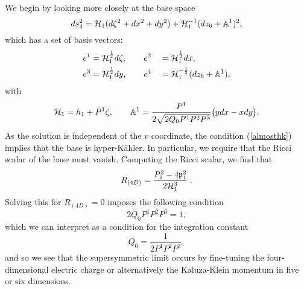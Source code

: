We begin by looking more closely at the base space
\begin{equation*}
    ds^2_4 = {\cal H}_1 ( d\zeta^2 + dx^2 + dy^2) + {\cal H}_1^{-1} (dz_6 + \mathbb{A}^1)^2 ,
\end{equation*}
which has a set of basis vectors:
\begin{equation*}
    \begin{aligned}
        e^1 &= {\cal H}_1^{\frac{1}{2}} d\zeta, \qquad e^2 &&= {\cal H}_1^{\frac{1}{2}} dx ,\\
        e^3 &= {\cal H}_1^{\frac{1}{2}} dy, \qquad e^4 &&= {\cal H}_1^{-\frac{1}{2}} (dz_6 + \mathbb{A}^1) ,\\
    \end{aligned}
\end{equation*}
with
\begin{equation}
{\cal H}_1 = h_1 + P^1 \zeta, \qquad \mathbb{A}^1={P^1 \over 2 \sqrt{2 Q_0 P^1 P^2 P^3}} \big(y dx-x dy \big).
\end{equation}
As the solution is independent of the $v$ coordinate, the condition ({\ref{almosthk}}) implies that the base is hyper-K\"ahler. In particular, we require that the Ricci scalar of the base must vanish. Computing the Ricci scalar, we find that
\begin{equation*}
	R_{(4D)} = \frac{P^2_1 - 4 \mathfrak{p}_1^2}{2 {\cal H}_1^3} \;.
\end{equation*}
Solving this for $R_{(4D)} = 0$ imposes the following condition
\begin{equation*}
2 Q_0 P^1 P^2 P^3 =1,
\end{equation*}
which we can interpret as a condition for the integration constant
\begin{equation*}
    Q_0 = \frac{1}{2 P^1 P^2 P^3} ,
\end{equation*}
and so we see that the supersymmetric limit occurs by fine-tuning the four-dimensional electric charge or alternatively the Kaluza-Klein momentum in five or six dimensions.

